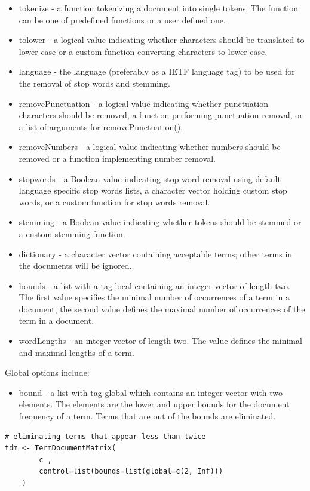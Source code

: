 \documentclass[10pt]{book}
\begin{document}
\begin{itemize}
  \item tokenize - a function tokenizing a document into single tokens. The function can be one of predefined functions or a user defined one.
  \item tolower - a logical value indicating whether characters should be translated to lower case or a custom function converting characters to lower case.
  \item language - the language (preferably as a IETF language tag) to be used for the removal of stop words and stemming.
  \item removePunctuation - a logical value indicating whether punctuation characters should be removed, a function performing punctuation removal, or a list of arguments for removePunctuation().
  \item removeNumbers - a logical value indicating whether numbers should be removed or a function implementing number removal.
  \item stopwords - a Boolean value indicating stop word removal using default language specific stop words lists, a character vector holding custom stop words, or a custom function for stop words removal.
  \item stemming - a Boolean value indicating whether tokens should be stemmed or a custom stemming function.
  \item dictionary - a character vector containing acceptable terms; other terms in the documents will be ignored.
  \item bounds - a list with a tag local containing an integer vector of length two. The first value specifies the minimal number of occurrences of a term in a document, the second value defines the maximal number of occurrences of the term in a document.
  \item wordLengths - an integer vector of length two. The value defines the minimal and maximal lengths of a term.
\end{itemize}

Global options include:

\begin{itemize}
  \item bound - a list with tag global which contains an integer vector with two elements. The elements are the lower and upper bounds for the document frequency of a term. Terms that are out of the bounds are eliminated.
\end{itemize}

\begin{verbatim}
# eliminating terms that appear less than twice
tdm <- TermDocumentMatrix(
        c ,
        control=list(bounds=list(global=c(2, Inf)))
    )
\end{verbatim}
\end{document}
